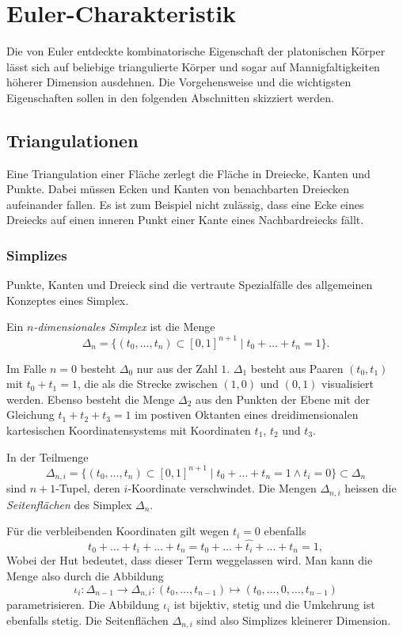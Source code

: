 %
%
\section{Euler-Charakteristik
\label{buch:topologie:section:euler-charakteristik}}
Die von Euler entdeckte kombinatorische Eigenschaft der platonischen
Körper lässt sich auf beliebige triangulierte Körper und sogar
auf Mannigfaltigkeiten höherer Dimension ausdehnen.
Die Vorgehensweise und die wichtigsten Eigenschaften sollen in den
folgenden Abschnitten skizziert werden.

%
%
\subsection{Triangulationen}
Eine Triangulation einer Fläche zerlegt die Fläche in Dreiecke,
Kanten und Punkte.
Dabei müssen Ecken und Kanten von benachbarten Dreiecken aufeinander
fallen.
Es ist zum Beispiel nicht zulässig, dass eine Ecke eines Dreiecks
auf einen inneren Punkt einer Kante eines Nachbardreiecks fällt.

%
%
\subsubsection{Simplizes}
Punkte, Kanten und Dreieck sind die vertraute Spezialfälle des allgemeinen
Konzeptes eines Simplex.

\begin{definition}[Simplex]
%
Ein \emph{$n$-dimensionales Simplex} ist die Menge
\[
\Delta_n
=
\{
(t_0,\dots,t_n)
\subset
[0,1]^{n+1}
\mid
t_0+\dots+t_n=1
\}.
\]
\end{definition}

Im Falle $n=0$ besteht $\Delta_0$ nur aus der Zahl $1$.
$\Delta_1$ besteht aus Paaren $(t_0,t_1)$ mit $t_0+t_1=1$, die
als die Strecke zwischen $(1,0)$ und $(0,1)$ visualisiert
werden.
Ebenso besteht die Menge $\Delta_2$ aus den Punkten der Ebene mit
der Gleichung $t_1+t_2+t_3=1$ im postiven Oktanten eines
dreidimensionalen kartesischen Koordinatensystems mit Koordinaten
$t_1$, $t_2$ und $t_3$.

In der Teilmenge
\[
\Delta_{n,i}
=
\{
(t_0,\dots,t_n)
\subset
[0,1]^{n+1}
\mid
t_0+\dots+t_n=1
\wedge
t_i=0
\}
\subset
\Delta_n
\]
sind $n+1$-Tupel, deren $i$-Koordinate verschwindet.
Die Mengen $\Delta_{n,i}$ heissen die \emph{Seitenflächen}
%
des Simplex $\Delta_n$.

Für die verbleibenden Koordinaten gilt wegen $t_i=0$ ebenfalls
\[
t_0+\dots+t_i+\dots+t_n
=
t_0+\dots+\widehat{t_i}+\dots+t_n
=
1,
\]
Wobei der Hut bedeutet, dass dieser Term weggelassen wird.
Man kann die Menge also durch die Abbildung
\[
\iota_i
\colon
\Delta_{n-1}
\to
\Delta_{n,i}
:
(t_0,\dots,t_{n-1})
\mapsto
(t_0,\dots,0,\dots,t_{n-1})
\]
parametrisieren.
Die Abbildung $\iota_i$ ist bijektiv, stetig und die Umkehrung ist
ebenfalls stetig.
Die Seitenflächen $\Delta_{n,i}$ sind also Simplizes kleinerer 
Dimension.

